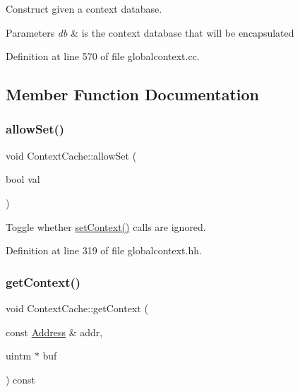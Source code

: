 Construct given a context database. 


\begin{DoxyParams}{Parameters}
{\em db} & is the context database that will be encapsulated \\
\hline
\end{DoxyParams}


Definition at line 570 of file globalcontext.\+cc.



\subsection{Member Function Documentation}
\mbox{\label{class_context_cache_a10a0900d3b134ffd881a2ba5d6c9c9df}} 
\subsubsection{\texorpdfstring{allowSet()}{allowSet()}}
{\footnotesize\ttfamily void Context\+Cache\+::allow\+Set (\begin{DoxyParamCaption}\item[{bool}]{val }\end{DoxyParamCaption})\hspace{0.3cm}{\ttfamily [inline]}}



Toggle whether \mbox{\hyperlink{class_context_cache_ac9f411a6a52bed3b3e59607371766c8b}{set\+Context()}} calls are ignored. 



Definition at line 319 of file globalcontext.\+hh.

\mbox{\label{class_context_cache_a541e54ada351d856bf06717bd8746714}} 
\subsubsection{\texorpdfstring{getContext()}{getContext()}}
{\footnotesize\ttfamily void Context\+Cache\+::get\+Context (\begin{DoxyParamCaption}\item[{const \mbox{\hyperlink{class_address}{Address}} \&}]{addr,  }\item[{uintm $\ast$}]{buf }\end{DoxyParamCaption}) const}



